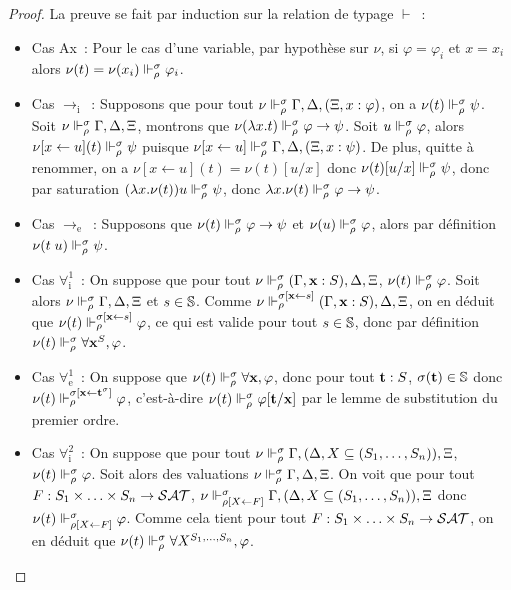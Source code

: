 \documentclass{article}
\begin{document}
\begin{proof}
  La preuve se fait par induction sur la relation de typage $\vdash$~:
  \begin{itemize}
  \item Cas Ax~: Pour le cas d'une variable, par hypothèse sur $\nu$, si $\varphi = \varphi_i$ et $x = x_i$ alors $\nu(t) = \nu(x_i)\Vdash_\rho^\sigma \varphi_i$.
  \item Cas $\to_\mathrm i$~: Supposons que pour tout $\nu \Vdash_\rho^\sigma \Gamma,\Delta,(\Xi, x : \varphi)$, on a $\nu(t) \Vdash_\rho^\sigma \psi$. Soit $\nu \Vdash_\rho^\sigma \Gamma,\Delta,\Xi$, montrons que $\nu(\lambda x.t)\Vdash_\rho^\sigma \varphi \to \psi$. Soit $u \Vdash_\rho^\sigma \varphi$, alors $\nu[x \leftarrow u](t)\Vdash_\rho^\sigma \psi$ puisque $\nu[x\leftarrow u]\Vdash_\rho^\sigma \Gamma,\Delta,(\Xi, x : \psi)$. De plus, quitte à renommer, on a $\nu[x\leftarrow u](t) = \nu(t)[u/x]$ donc $\nu(t)[u/x]\Vdash_\rho^\sigma \psi$, donc par saturation $(\lambda x.\nu(t)) u \Vdash_\rho^\sigma \psi$, donc $\lambda x.\nu(t)\Vdash_\rho^\sigma \varphi\to\psi$.
  \item Cas $\to_\mathrm e$~: Supposons que $\nu(t)\Vdash_\rho^\sigma \varphi \to \psi$ et $\nu(u)\Vdash_\rho^\sigma \varphi$, alors par définition $\nu(t\;u)\Vdash_\rho^\sigma \psi$.
  \item Cas $\forall_\mathrm i^1$~: On suppose que pour tout $\nu\Vdash_\rho^\sigma (\Gamma, \mathbf{x} : S),\Delta,\Xi$, $\nu(t)\Vdash_\rho^\sigma \varphi$. Soit alors $\nu\Vdash_\rho^\sigma \Gamma,\Delta,\Xi$ et $s \in \mathbb{S}$. Comme $\nu\Vdash_\rho^{\sigma[\mathbf{x}\leftarrow s]} (\Gamma,\mathbf{x} : S), \Delta,\Xi$, on en déduit que $\nu(t)\Vdash_\rho^{\sigma[\mathbf{x}\leftarrow s]} \varphi$, ce qui est valide pour tout $s\in \mathbb{S}$, donc par définition $\nu(t)\Vdash_\rho^\sigma \forall \mathbf{x}^S, \varphi$.
  \item Cas $\forall_\mathrm e^1$~: On suppose que $\nu(t)\Vdash_\rho^\sigma \forall \mathbf{x}, \varphi$, donc pour tout $\mathbf{t} : S$, $\sigma(\mathbf{t}) \in \mathbb S$ donc $\nu(t)\Vdash_{\rho}^{\sigma[\mathbf{x}\leftarrow \mathbf{t}^\sigma]} \varphi$, c'est-à-dire $\nu(t)\Vdash_\rho^\sigma \varphi[\mathbf{t}/\mathbf{x}]$ par le lemme de substitution du premier ordre.
  \item Cas $\forall_\mathrm i^2$~: On suppose que pour tout $\nu\Vdash_\rho^\sigma \Gamma, (\Delta, X \subseteq (S_1,\ldots,S_n)), \Xi$, $\nu(t) \Vdash_\rho^\sigma \varphi$. Soit alors des valuations $\nu\Vdash_\rho^\sigma\Gamma, \Delta,\Xi$. On voit que pour tout $F : S_1\times\ldots\times S_n \to \mathcal {SAT}$, $\nu\Vdash_{\rho[X\leftarrow F]}^\sigma \Gamma, (\Delta, X \subseteq (S_1,\ldots,S_n)),\Xi$ donc $\nu(t)\Vdash_{\rho[X\leftarrow F]}^\sigma \varphi$. Comme cela tient pour tout $F : S_1\times\ldots\times S_n \to \mathcal {SAT}$, on en déduit que $\nu(t)\Vdash_\rho^\sigma \forall X^{S_1,\ldots,S_n}, \varphi$.

\end{itemize}
\end{proof}
\end{document}
